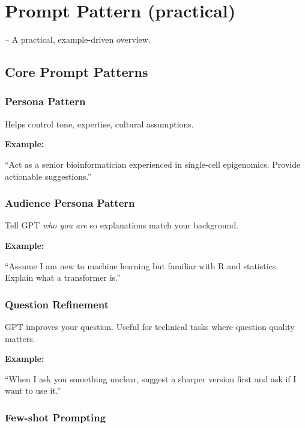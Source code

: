 \documentclass[
  letterpaper,
  DIV=11,
  numbers=noendperiod]{scrreprt}
\begin{document}

\chapter{Prompt Pattern (practical)}\label{prompt-pattern-practical}

-- A practical, example-driven overview.

\hfill\break

\section{Core Prompt Patterns}\label{core-prompt-patterns}

\subsection{Persona Pattern}\label{persona-pattern}

Helps control tone, expertise, cultural assumptions.

\textbf{Example:}

``Act as a senior bioinformatician experienced in single-cell
epigenomics. Provide actionable suggestions.''

\subsection{Audience Persona Pattern}\label{audience-persona-pattern}

Tell GPT \emph{who you are} so explanations match your background.

\textbf{Example:}

``Assume I am new to machine learning but familiar with R and
statistics. Explain what a transformer is.''

\subsection{Question Refinement}\label{question-refinement}

GPT improves your question. Useful for technical tasks where question
quality matters.

\textbf{Example:}

``When I ask you something unclear, suggest a sharper version first and
ask if I want to use it.''

\subsection{Few-shot Prompting}\label{few-shot-prompting}
\end{document}

